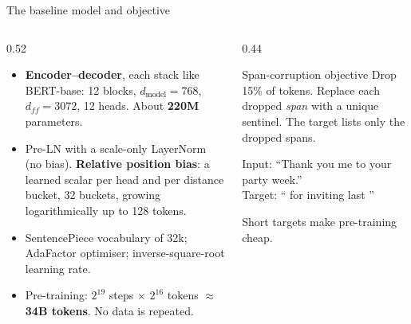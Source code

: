 \documentclass[aspectratio=169,11pt]{beamer}
\begin{document}
\begin{frame}{The baseline model and objective}
  \begin{columns}[T]
    \begin{column}{0.52\textwidth}
      \small
      \begin{itemize}
        \item \textbf{Encoder--decoder}, each stack like BERT-base: 12 blocks, $d_{\text{model}}=768$, $d_{ff}=3072$, 12 heads. About \textbf{220M} parameters.
        \item Pre-LN with a scale-only LayerNorm (no bias). \textbf{Relative position bias}: a learned scalar per head and per distance bucket, 32 buckets, growing logarithmically up to 128 tokens.
        \item SentencePiece vocabulary of 32k; AdaFactor optimiser; inverse-square-root learning rate.
        \item Pre-training: $2^{19}$ steps $\times$ $2^{16}$ tokens $\approx$ \textbf{34B tokens}. No data is repeated.
      \end{itemize}
    \end{column}
    \begin{column}{0.44\textwidth}
      \begin{exampleblock}{Span-corruption objective}
        \small
        Drop 15\% of tokens. Replace each dropped \emph{span} with a unique sentinel. The target lists only the dropped spans.
        \vspace{1mm}

        Input: ``Thank you  me to your party  week.''\\
        Target: `` for inviting  last ''
        \vspace{1mm}

        Short targets make pre-training cheap.
      \end{exampleblock}
    \end{column}
  \end{columns}
\end{frame}
\end{document}
